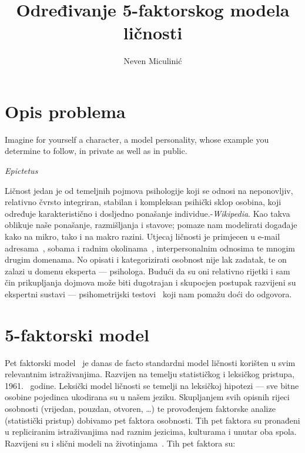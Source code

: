 \documentclass[times, utf8, seminar]{fer}
\begin{document}
\theoremstyle{definition}
\newtheorem{definition}{Definition}[section]

\title{Određivanje 5-faktorskog modela ličnosti}
\author{Neven Miculinić}

\maketitle
\tableofcontents

\chapter{Opis problema}

\epigraph{Imagine for yourself a character, a model personality, whose example you determine to follow, in private as well as in public.
}{\textit{Epictetus}}
Ličnost jedan je od temeljnih pojmova psihologije koji se odnosi na neponovljiv, relativno čvrsto integriran, stabilan i kompleksan psihički sklop osobina, koji određuje karakteristično i dosljedno ponašanje individue.-\textit{Wikipedia}.
Kao takva oblikuje naše ponašanje, razmišljanja i stavove; pomaze nam modelirati događaje kako na mikro, tako i na makro razini. Utjecaj ličnosti je primjecen u e-mail adresama~\cite{mail-personality}, sobama i radnim okolinama~\cite{gosling2002room}, interpersonalnim odnosima te mnogim drugim domenama.
No opisati i kategorizirati osobnost nije lak zadatak, te on zalazi u domenu eksperta --- psihologa.
Budući da su oni relativno rijetki i sam čin prikupljanja dojmova može biti dugotrajan i skupocjen postupak razvijeni su ekspertni sustavi --- psihometrijski testovi~\cite{cronbach1949essentials} koji nam pomažu doći do odgovora.
\chapter{5-faktorski model}

Pet faktorski model~\cite{mccrae1992introduction} je danas de facto standardni model ličnosti korišten u svim relevantnim istraživanjima.
Razvijen na temelju statističkog i leksičkog pristupa, 1961.~\cite{tupes1961recurrent} godine.
Leksički model ličnosti se temelji na leksičkoj hipotezi --- sve bitne osobine pojedinca ukodirana su u našem jeziku.
Skupljanjem svih opisnih rijeci osobnosti (vrijedan, pouzdan, otvoren, \ldots) te provođenjem faktorske analize (statistički pristup) dobivamo pet faktora osobnosti.
Tih pet faktora su pronađeni u repliciranim istraživanjima nad raznim jezicima, kulturama i unutar oba spola.
Razvijeni su i slični modeli na životinjama~\cite{king1997five}. Tih pet faktora su:
\end{document}
